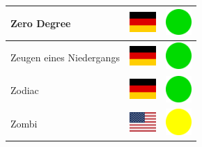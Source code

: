 \documentclass[12pt, a4paper, twoside]{report}
\begin{document}
\begin{center}
\begin{longtable}{|p{5cm}|p{2cm}|p{2cm}|}
 Zero Degree                                                & \includegraphics[width=1cm]{../img/flags/de} &   \includegraphics[width=1cm]{../likes/y} \\ \hline
 Zeugen eines Niedergangs                                   & \includegraphics[width=1cm]{../img/flags/de} &   \includegraphics[width=1cm]{../likes/y} \\ \hline
 Zodiac                                                     & \includegraphics[width=1cm]{../img/flags/de} &   \includegraphics[width=1cm]{../likes/y} \\ \hline
 Zombi                                                      & \includegraphics[width=1cm]{../img/flags/us} &   \includegraphics[width=1cm]{../likes/m} \\ \hline
		\end{longtable}
	\end{center}
\end{document}

